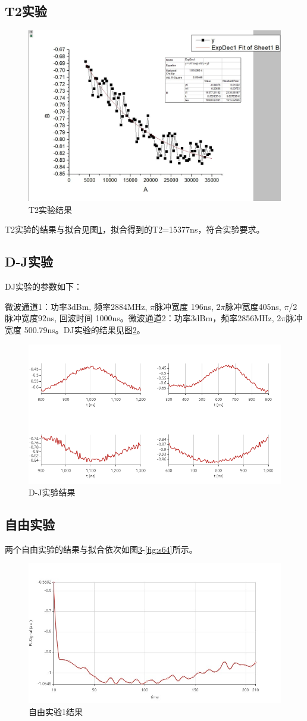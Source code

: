 \documentclass[a4paper]{article}
\begin{document}
\subsection{T2实验}
\begin{figure}[htbp]
	\centering
	\includegraphics[width=0.7\linewidth]{data/4/1.JPG}
	\caption{T2实验结果}
	\label{fig:s41}
\end{figure}
T2实验的结果与拟合见图\ref{fig:s41}，拟合得到的T2=15377ns，符合实验要求。

\subsection{D-J实验}
DJ实验的参数如下：

微波通道1：功率3dBm, 频率2884MHz, $\pi$脉冲宽度 196ns, 2$\pi$脉冲宽度405ns, $\pi$/2 脉冲宽度92ns, 回波时间 1000ns。微波通道2：功率3dBm，频率2856MHz, 2$\pi$脉冲宽度 500.79ns。DJ实验的结果见图\ref{fig:s51}。
\begin{figure}[htbp]
	\centering
	\includegraphics[width=0.7\linewidth]{data/DJ/DjExperiment_2024-06-07-19-36-17.jpeg}
	\caption{D-J实验结果}
	\label{fig:s51}
\end{figure}
\subsection{自由实验}
两个自由实验的结果与拟合依次如图\ref{fig:s61}-\ref{fig:s64}所示。
\begin{figure}[htbp]
	\centering
	\includegraphics[width=0.4\linewidth]{data/free/Free -2024-06-07-19-09-51.jpeg}
	\caption{自由实验1结果}
	\label{fig:s61}
\end{figure}
\end{document}
